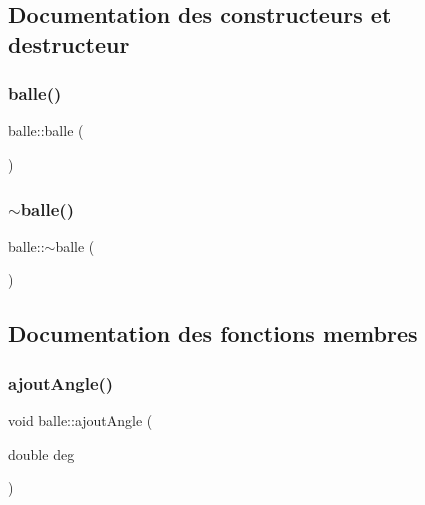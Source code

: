 \subsection{Documentation des constructeurs et destructeur}
\mbox{\label{classballe_a920553f18fd7e691bb8fb3fed24d7f40}} 
\subsubsection{\texorpdfstring{balle()}{balle()}}
{\footnotesize\ttfamily balle\+::balle (\begin{DoxyParamCaption}{ }\end{DoxyParamCaption})}

\mbox{\label{classballe_a25f4ff369af6e6dcfb19c5f1464309fc}} 
\subsubsection{\texorpdfstring{$\sim$balle()}{~balle()}}
{\footnotesize\ttfamily balle\+::$\sim$balle (\begin{DoxyParamCaption}{ }\end{DoxyParamCaption})}



\subsection{Documentation des fonctions membres}
\mbox{\label{classballe_ac2beb3bc9905e417d165aa0c454c152f}} 
\subsubsection{\texorpdfstring{ajout\+Angle()}{ajoutAngle()}}
{\footnotesize\ttfamily void balle\+::ajout\+Angle (\begin{DoxyParamCaption}\item[{double}]{deg }\end{DoxyParamCaption})}

\mbox{\label{classballe_a936eca3095fe64cc005421f3ad9fd3f3}} 
